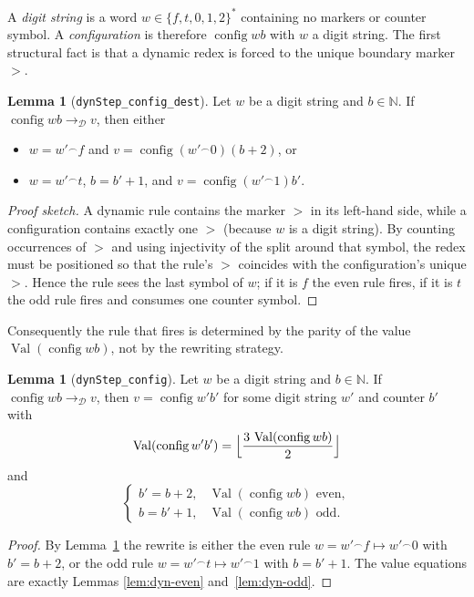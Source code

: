 \documentclass[11pt,a4paper]{article}
\theoremstyle{definition}
\newtheorem{lemma}[definition]{Lemma}
\newcommand{\gt}{>}
\newcommand{\Nat}{\mathbb{N}}
\newcommand{\val}{\operatorname{Val}}
\newcommand{\conc}{{^\frown}}
\newcommand{\config}{\operatorname{config}}
\newcommand{\dynRules}{\mathcal{D}}
\begin{document}
A \emph{digit string} is a word
$w\in\{f,t,0,1,2\}^{*}$ containing no markers or counter symbol.  A
\emph{configuration} is therefore $\config w b$ with $w$ a digit string.
The first structural fact is that a dynamic redex is forced to the
unique boundary marker $\gt$.

\begin{lemma}[\texttt{dynStep\_config\_dest}]
\label{lem:dyn-align}
Let $w$ be a digit string and $b\in\Nat$.  If
$\config w b\to_{\dynRules}v$, then either
\begin{itemize}
\item $w=w'\conc f$ and $v=\config{(w'\conc0)}{(b+2)}$, or
\item $w=w'\conc t$, $b=b'+1$, and $v=\config{(w'\conc1)}{b'}$.
\end{itemize}
\end{lemma}
\begin{proof}[Proof sketch]
A dynamic rule contains the marker $\gt$ in its left-hand side, while a
configuration contains exactly one $\gt$ (because $w$ is a digit
string).  By counting occurrences of $\gt$ and using injectivity of the
split around that symbol, the redex must be positioned so that the rule's
$\gt$ coincides with the configuration's unique $\gt$.  Hence the rule
sees the last symbol of $w$; if it is $f$ the even rule fires, if it is
$t$ the odd rule fires and consumes one counter symbol.
\end{proof}

Consequently the rule that fires is determined by the parity of the
value $\val(\config w b)$, not by the rewriting strategy.

\begin{lemma}[\texttt{dynStep\_config}]
\label{lem:dyn-step-config}
Let $w$ be a digit string and $b\in\Nat$.  If
$\config w b\to_{\dynRules}v$, then $v=\config{w'}{b'}$ for some digit
string $w'$ and counter $b'$ with
\[
  \val(\config{w'}{b'})=\Bigl\lfloor\frac{3\,\val(\config w b)}2\Bigr\rfloor
\]
and
\[
  \begin{cases}
    b'=b+2, & \val(\config w b)\text{ even},\\
    b=b'+1, & \val(\config w b)\text{ odd}.
  \end{cases}
\]
\end{lemma}
\begin{proof}
By Lemma~\ref{lem:dyn-align} the rewrite is either the even rule
$w=w'\conc f\mapsto w'\conc0$ with $b'=b+2$, or the odd rule
$w=w'\conc t\mapsto w'\conc1$ with $b=b'+1$.  The value equations are
exactly Lemmas \ref{lem:dyn-even} and~\ref{lem:dyn-odd}.
\end{proof}
\end{document}
